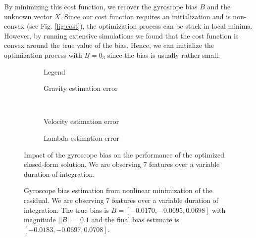 \documentclass[letterpaper, 10 pt, journal, twoside]{IEEEtran}  %
\begin{document}
By minimizing this cost function, we recover the gyroscope bias $B$ and the unknown vector $X$.
Since our cost function requires an initialization and is non-convex (see Fig. \ref{fig:cost}),
the optimization process can be stuck in local minima.
However, by running extensive simulations we found that the cost function is convex around the true value of the bias. Hence, we can initialize the optimization process with $B = 0_3$ since the bias is usually rather small.



\begin{figure}
  \centering
        \hspace{0.2\columnwidth}%
        \begin{subfigure}[b]{0.3\columnwidth}
                \resizebox{\columnwidth}{!}{}
                \caption{Legend}

        \end{subfigure}%
        \begin{subfigure}[b]{0.5\columnwidth}
                \resizebox{\columnwidth}{!}{}
                \caption{Gravity estimation error}

        \end{subfigure}
        ~
        \begin{subfigure}[b]{0.5\columnwidth}
                \resizebox{\columnwidth}{!}{}
                \caption{Velocity estimation error}

        \end{subfigure}%
        \begin{subfigure}[b]{0.5\columnwidth}
                \resizebox{\columnwidth}{!}{}
                \caption{Lambda estimation error}

        \end{subfigure}
        \caption{Impact of the gyroscope bias on the performance of the optimized closed-form solution. We are observing 7 features  over a variable duration of integration. \label{fig:biasGyroOpt}}
\end{figure}

\begin{figure}
  \centering
  \resizebox{0.8\columnwidth}{!}{}
  \caption{Gyroscope bias estimation from nonlinear minimization of the residual.
    We are observing 7 features over a variable duration of integration.
    The true bias is $B=[-0.0170, -0.0695, 0.0698]$ with magnitude $||B||=0.1$ and the final bias estimate is $[-0.0183, -0.0697, 0.0708]$.\label{fig:gBiasEstimate}}
\end{figure}
\end{document}
